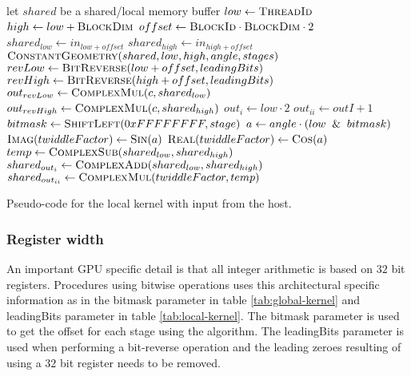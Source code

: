 \begin{algorithm}
	\centering
	\begin{algorithmic}[1]
            \State let $shared$ be a shared/local memory buffer     
            \State $low  \gets \Call{ThreadId}{}$
            \State $high \gets low + \Call{BlockDim}{}$   
            \State $offset \gets \Call{BlockId}{} \cdot \Call{BlockDim}{} \cdot 2$
			\newline
            \State $shared_{low}  \gets in_{low + offset}$
            \State $shared_{high} \gets in_{high + offset}$
            \State $\Call{ConstantGeometry}{shared, low, high, angle, stages}$
            \newline
            \State $revLow  \gets \Call{BitReverse}{low + offset, leadingBits}$
            \State $revHigh \gets \Call{BitReverse}{high + offset, leadingBits}$
            \State $out_{revLow}  \gets \Call{ComplexMul}{c, shared_{low}}$
            \State $out_{revHigh} \gets \Call{ComplexMul}{c, shared_{high}}$
        \EndProcedure
        \Statex
            \State $out_{i} \gets low \cdot 2$
            \State $out_{ii} \gets outI + 1$
	            \newline
            	\State $bitmask \gets \Call{ShiftLeft}{0xFFFFFFFF, stage}$
            	\State $a \gets angle \cdot (low \And bitmask)$
            	\State $\Call{Imag}{twiddleFactor} \gets \Call{Sin}{a}$
            	\State $\Call{Real}{twiddleFactor} \gets \Call{Cos}{a}$
            	\newline
				\State $temp \gets \Call{ComplexSub}{shared_{low}, shared_{high}}$
				\State $shared_{out_{i}} \gets \Call{ComplexAdd}{shared_{low}, shared_{high}}$
				\State $shared_{out_{ii}} \gets \Call{ComplexMul}{twiddleFactor, temp}$
			\EndFor
        \EndProcedure
	\end{algorithmic}
	\caption{Pseudo-code for the local kernel with input from the host.}
	\label{alg:device:local-kernel}
\end{algorithm}

\subsubsection{Register width}

An important GPU specific detail is that all integer arithmetic is based on $32$ bit registers. Procedures using bitwise operations uses this architectural specific information as in the bitmask parameter in table \ref{tab:global-kernel} and leadingBits parameter in table \ref{tab:local-kernel}. The bitmask parameter is used to get the offset for each stage using the {\CTALG} algorithm. The leadingBits parameter is used when performing a bit-reverse operation and the leading zeroes resulting of using a $32$ bit register needs to be removed.

